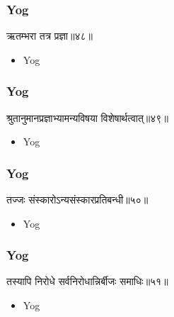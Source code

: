 \begin{frame}[fragile]\frametitle{Yog}
\begin{sanskrit}
ऋतम्भरा तत्र प्रज्ञा॥४८॥
\end{sanskrit}
	\begin{itemize}
	\item Yog 
	\end{itemize}
\end{frame}



\begin{frame}[fragile]\frametitle{Yog}
\begin{sanskrit}
श्रुतानुमानप्रज्ञाभ्यामन्यविषया विशेषार्थत्वात्॥४९॥
\end{sanskrit}
	\begin{itemize}
	\item Yog 
	\end{itemize}
\end{frame}


\begin{frame}[fragile]\frametitle{Yog}
\begin{sanskrit}
तज्जः संस्कारोऽन्यसंस्कारप्रतिबन्धी॥५०॥
\end{sanskrit}
	\begin{itemize}
	\item Yog 
	\end{itemize}
\end{frame}


\begin{frame}[fragile]\frametitle{Yog}
\begin{sanskrit}
तस्यापि निरोधे सर्वनिरोधान्निर्बीजः समाधिः॥५१॥
\end{sanskrit}
	\begin{itemize}
	\item Yog 
	\end{itemize}
\end{frame}
